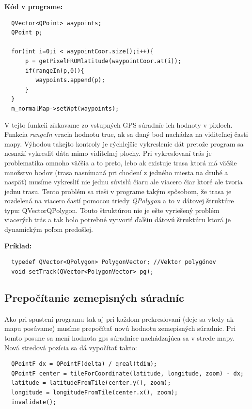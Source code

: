 \begin{flushleft}
\textbf{Kód v programe:}
\begin{verbatim}
  QVector<QPoint> waypoints;
  QPoint p;                

  for(int i=0;i < waypointCoor.size();i++){
      p = getPixelFROMlatitude(waypointCoor.at(i));
      if(rangeIn(p,0)){
         waypoints.append(p);                
      }
  }
  m_normalMap->setWpt(waypoints);
\end{verbatim}
\end{flushleft}

V tejto funkcii získavame zo vstupných GPS súradníc ich hodnoty v pixloch. Funkcia \textit{rangeIn} vracia hodnotu true, ak sa daný bod nachádza na viditeľnej časti mapy. Výhodou takejto kontroly je rýchlejšie vykreslenie dát pretože program sa nesnaží vykresliť dáta mimo viditeľnej plochy. Pri vykresľovaní trás je problematika omnoho väčšia a to preto, lebo ak existuje trasa ktorá má väčšie množstvo bodov (trasa nasnímaná pri chodení z jedného miesta na druhé a naspäť) musíme vykresliť nie jednu súvislú čiaru ale viacero čiar ktoré ale tvoria jednu trasu. Tento problém sa rieši v programe takým spôsobom, že trasa je rozdelená na viacero častí pomocou triedy \textit{QPolygon} a to v dátovej štruktúre typu: QVector{QPolygon}. Touto štruktúrou nie je ešte vyriešený problém viacerých trás a tak bolo potrebné vytvoriť ďalšiu dátovú štruktúru ktorá je dynamickým poľom predošlej. 
\begin{flushleft}
\textbf{Príklad:}
\begin{verbatim}
  typedef QVector<QPolygon> PolygonVector; //Vektor polygónov
  void setTrack(QVector<PolygonVector> pg);
\end{verbatim}
\end{flushleft}


\subsection{Prepočítanie zemepisných súradníc}
\paragraph{}
Ako pri spustení programu tak aj pri každom prekresľovaní (deje sa vtedy ak mapu posúvame) musíme prepočítať novú hodnotu zemepisných súradníc. Pri tomto posune sa mení hodnota gps súradnice nachádzajúca sa v strede mapy. Nová stredová pozícia sa dá vypočítať takto:
\begin{verbatim}
  QPointF dx = QPointF(delta) / qreal(tdim);
  QPointF center = tileForCoordinate(latitude, longitude, zoom) - dx;
  latitude = latitudeFromTile(center.y(), zoom);
  longitude = longitudeFromTile(center.x(), zoom);
  invalidate();
\end{verbatim}

